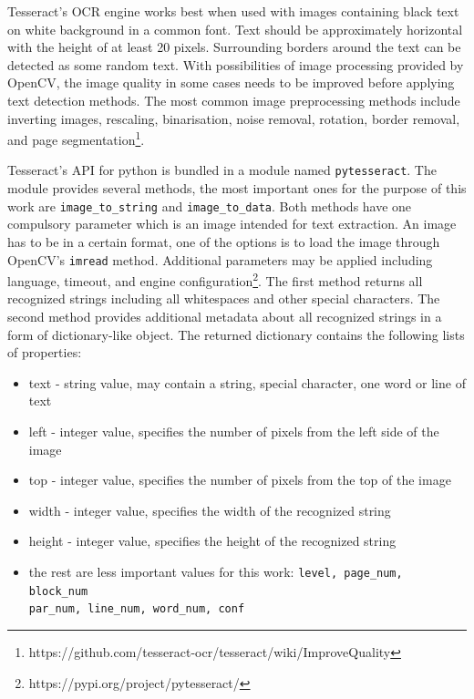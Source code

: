 Tesseract's OCR engine works best when used with images containing black text on white background in a common font. Text should be approximately horizontal with the height of at least 20 pixels. Surrounding borders around the text can be detected as some random text. With possibilities of image processing provided by OpenCV, the image quality in some cases needs to be improved before applying text detection methods. The most common image preprocessing methods include inverting images, rescaling, binarisation, noise removal, rotation, border removal, and page segmentation\footnote{https://github.com/tesseract-ocr/tesseract/wiki/ImproveQuality}.

Tesseract's API for python is bundled in a module named \texttt{pytesseract}. The module provides several methods, the most important ones for the purpose of this work are \verb|image_to_string| and \verb|image_to_data|. Both methods have one compulsory parameter which is an image intended for text extraction. An image has to be in a certain format, one of the options is to load the image through OpenCV's \texttt{imread} method. Additional parameters may be applied including language, timeout, and engine configuration\footnote{https://pypi.org/project/pytesseract/}. The first method returns all recognized strings including all whitespaces and other special characters. The second method provides additional metadata about all recognized strings in a form of dictionary-like object. The returned dictionary contains the following lists of properties:

\begin{itemize}
    \item text - string value, may contain a string, special character, one word or line of text
    \item left - integer value, specifies the number of pixels from the left side of the image 
    \item top - integer value, specifies the number of pixels from the top of the image
    \item width - integer value, specifies the width of the recognized string 
    \item height - integer value, specifies the height of the recognized string
    \item the rest are less important values for this work: \verb|level, page_num, block_num| \\ \verb|par_num, line_num, word_num, conf|
\end{itemize}

